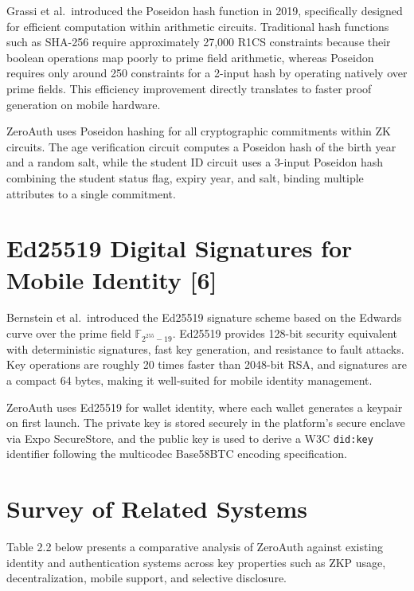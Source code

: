 Grassi et al.\ introduced the Poseidon hash function in 2019, specifically designed for efficient computation within arithmetic circuits. Traditional hash functions such as SHA-256 require approximately 27,000 R1CS constraints because their boolean operations map poorly to prime field arithmetic, whereas Poseidon requires only around 250 constraints for a 2-input hash by operating natively over prime fields. This efficiency improvement directly translates to faster proof generation on mobile hardware.

ZeroAuth uses Poseidon hashing for all cryptographic commitments within ZK circuits. The age verification circuit computes a Poseidon hash of the birth year and a random salt, while the student ID circuit uses a 3-input Poseidon hash combining the student status flag, expiry year, and salt, binding multiple attributes to a single commitment.

\section{Ed25519 Digital Signatures for Mobile Identity [6]}

Bernstein et al.\ introduced the Ed25519 signature scheme based on the Edwards curve over the prime field $\mathbb{F}_{2^{255}-19}$. Ed25519 provides 128-bit security equivalent with deterministic signatures, fast key generation, and resistance to fault attacks. Key operations are roughly 20 times faster than 2048-bit RSA, and signatures are a compact 64 bytes, making it well-suited for mobile identity management.

ZeroAuth uses Ed25519 for wallet identity, where each wallet generates a keypair on first launch. The private key is stored securely in the platform's secure enclave via Expo SecureStore, and the public key is used to derive a W3C \texttt{did:key} identifier following the multicodec Base58BTC encoding specification.

\section{Survey of Related Systems}

Table 2.2 below presents a comparative analysis of ZeroAuth against existing identity and authentication systems across key properties such as ZKP usage, decentralization, mobile support, and selective disclosure.

